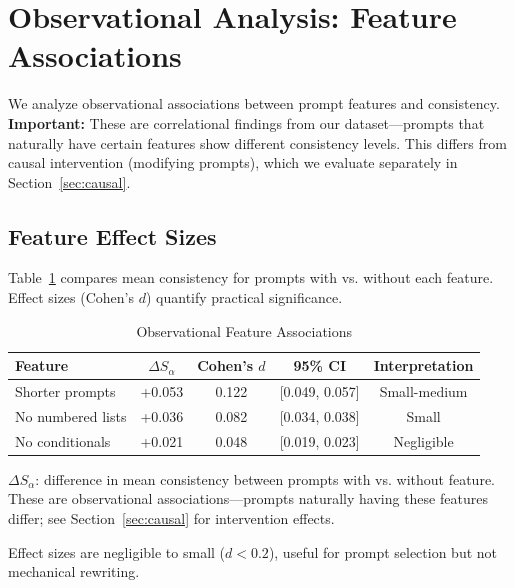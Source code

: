 \documentclass[sigconf,anonymous,review]{acmart}
\begin{document}
\section{Observational Analysis: Feature Associations}
\label{sec:observational}

We analyze observational associations between prompt features and consistency. \textbf{Important:} These are correlational findings from our dataset---prompts that naturally have certain features show different consistency levels. This differs from causal intervention (modifying prompts), which we evaluate separately in Section~\ref{sec:causal}.

\subsection{Feature Effect Sizes}

Table~\ref{tab:observational} compares mean consistency for prompts with vs. without each feature. Effect sizes (Cohen's $d$) quantify practical significance.

\begin{table}[t]
\centering
\caption{Observational Feature Associations}
\label{tab:observational}
\small
\begin{tabular}{@{}lcccc@{}}
\toprule
\textbf{Feature} & \textbf{$\Delta S_\alpha$} & \textbf{Cohen's $d$} & \textbf{95\% CI} & \textbf{Interpretation} \\
\midrule
Shorter prompts & +0.053 & 0.122 & [0.049, 0.057] & Small-medium \\
No numbered lists & +0.036 & 0.082 & [0.034, 0.038] & Small \\
No conditionals & +0.021 & 0.048 & [0.019, 0.023] & Negligible \\
\bottomrule
\end{tabular}
\vspace{0.3em}

\raggedright\footnotesize $\Delta S_\alpha$: difference in mean consistency between prompts with vs. without feature. These are observational associations---prompts naturally having these features differ; see Section~\ref{sec:causal} for intervention effects.
\end{table}

Effect sizes are negligible to small ($d < 0.2$), useful for prompt selection but not mechanical rewriting.

\end{document}
